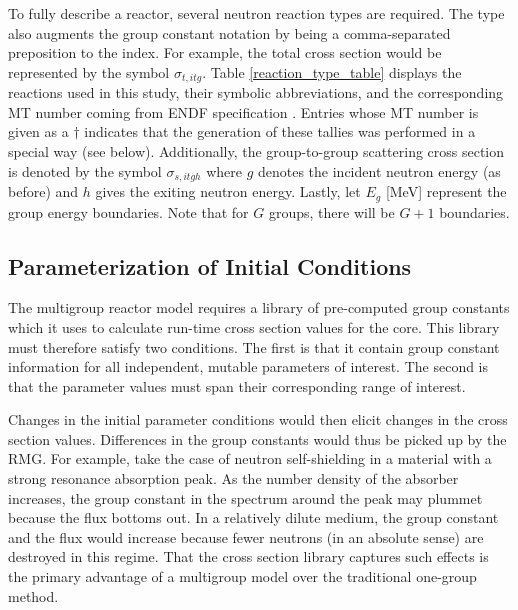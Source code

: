 To fully describe a reactor, several neutron reaction types are required.  The type 
also augments the group constant notation by being a comma-separated preposition to 
the index.  For example, the total cross section would be represented by the symbol 
$\sigma_{t,itg}$. Table \ref{reaction_type_table} displays the reactions used in this 
study, their symbolic abbreviations, and the corresponding MT number coming from ENDF 
specification \cite{MFMT}.  Entries whose MT number is given as a $\dagger$ indicates 
that the generation of these tallies was performed in a special way (see below).
Additionally, the group-to-group scattering cross section is denoted by the symbol
$\sigma_{s,itgh}$ where $g$ denotes the incident neutron energy (as before) and $h$
gives the exiting neutron energy.  Lastly, let $E_g$ [MeV] represent the group 
energy boundaries.  Note that for $G$ groups, there will be $G+1$ boundaries.

\subsection{Parameterization of Initial Conditions}
\label{mg_sec:param_ic}
The multigroup reactor model requires a library of pre-computed group constants which it uses
to calculate run-time cross section values for the core.  This library must therefore satisfy 
two conditions.  The first is that it contain group constant information for all independent, 
mutable parameters of interest.  The second is that the parameter values must span 
their corresponding range of interest.  

Changes in the initial parameter conditions would then elicit changes in the cross section 
values. Differences in the group constants would thus be picked up by the RMG.  For example, 
take the case of neutron self-shielding in a material with a strong resonance absorption peak.  
As the number density of the absorber increases, the group constant in the spectrum around 
the peak may plummet because the flux bottoms out.  In a relatively dilute medium, the group 
constant and the flux would increase because fewer neutrons (in an absolute sense) are destroyed 
in this regime.  That the  cross section library captures such effects is the primary advantage 
of a multigroup model over the traditional one-group method.

